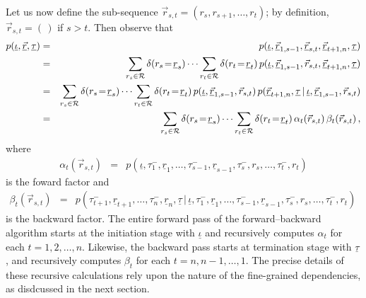\documentclass[a4paper]{article}
\newcommand{\ui}{\underline{\iota}}
\newcommand{\ut}{\underline{\tau}}
\newcommand{\ur}{\underline{r}}
\newcommand{\vr}{\vec{r}}
\newcommand{\uvr}{\underline{\vr}}
\newcommand{\tm}{\tau^{-}}
\begin{document}
Let us now define the sub-sequence $\vr_{s,t}=(r_s,r_{s+1},\ldots,r_t)$; by definition,
$\vr_{s,t}=(\,)$ if $s>t$.
Then observe that
\begin{eqnarray}
p(\ui,\uvr,\ut) 
& = &
p(\ui,\uvr_{1,s-1},\uvr_{s,t},\uvr_{t+1,n},\ut)
\nonumber\\
& = &
\sum_{r_s\in{\cal R}} \delta(r_s\!=\!\ur_s)
\cdots\sum_{r_t\in{\cal R}} \delta(r_t\!=\!\ur_t)
\,p(\ui,\uvr_{1,s-1},\vr_{s,t},\uvr_{t+1,n},\ut)
\nonumber\\
& = &
\sum_{r_s\in{\cal R}} \delta(r_s\!=\!\ur_s)
\cdots\sum_{r_t\in{\cal R}} \delta(r_t\!=\!\ur_t)
\,p(\ui,\uvr_{1,s-1},\vr_{s,t})
\,p(\uvr_{t+1,n},\ut\,|\,\ui,\uvr_{1,s-1},\vr_{s,t})
\nonumber\\
& = &
\sum_{r_s\in{\cal R}} \delta(r_s\!=\!\ur_s)
\cdots\sum_{r_t\in{\cal R}} \delta(r_t\!=\!\ur_t)
\,\alpha_t(\vr_{s,t})\,\beta_t(\vr_{s,t})\,,
\end{eqnarray}
where
\begin{eqnarray}
\alpha_t(\vr_{s,t}) & = & p(\ui,\tau_1^-,\ur_1,\ldots,\tm_{s-1},\ur_{s-1},
\tm_s,r_s,\ldots,\tm_t,r_t)
\label{eq:fwd-pass-basic}
\end{eqnarray}
is the foward factor
and
\begin{eqnarray}
\beta_t(\vr_{s,t}) & = & 
p(\tm_{t+1},\ur_{t+1},\ldots,\tm_n,\ur_n,\ut\,|\,\ui,\tau_1^-,\ur_1,\ldots,\tm_{s-1},\ur_{s-1},
\tm_s,r_s,\ldots,\tm_t,r_t)\
\label{eq:bwd-pass-basic}
\end{eqnarray}
is the backward factor.
The entire forward pass of the forward--backward algorithm starts at the initiation stage with $\ui$ and
recursively computes $\alpha_t$ for each $t=1,2,\ldots,n$. Likewise,
the backward pass starts at termination stage with $\ut$, and recursively computes $\beta_t$
for each $t=n,n-1,\ldots,1$. The precise details of these recursive calculations rely upon
the nature of the fine-grained dependencies, as disdcussed in the next section.

\end{document}
